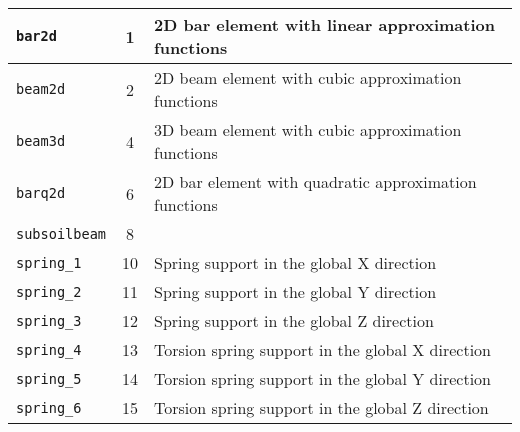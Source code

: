\begin{center}
\begin{tabular}{|l|c|l|}
\hline
{\tt bar2d} & 1 & 2D bar element with linear approximation functions
\\ \hline
{\tt beam2d} & 2 & 2D beam element with cubic approximation functions
\\ \hline
{\tt beam3d} & 4 & 3D beam element with cubic approximation functions
\\ \hline
{\tt barq2d} & 6 & 2D bar element with quadratic approximation functions
\\ \hline
{\tt subsoilbeam} & 8 &
\\ \hline
{\tt spring\_1} & 10 & Spring support in the global X direction
\\ \hline
{\tt spring\_2} & 11 & Spring support in the global Y direction
\\ \hline
{\tt spring\_3} & 12 & Spring support in the global Z direction
\\ \hline
{\tt spring\_4} & 13 & Torsion spring support in the global X direction
\\ \hline
{\tt spring\_5} & 14 & Torsion spring support in the global Y direction
\\ \hline
{\tt spring\_6} & 15 & Torsion spring support in the global Z direction
\\ \hline
\end{tabular}


\end{center}
